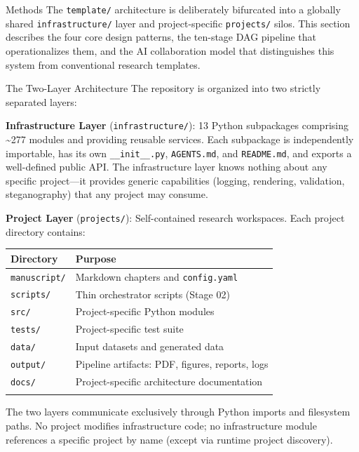 \documentclass[
  ignorenonframetext,
]{beamer}
\author{\texorpdfstring{}{}}
\date{}
\newcounter{none} %
\begin{document}
\begin{frame}[fragile]{Methods}
\protect{}\label{methods}
The \texttt{template/} architecture is deliberately bifurcated into a
globally shared \texttt{infrastructure/} layer and project-specific
\texttt{projects/} silos. This section describes the four core design
patterns, the ten-stage DAG pipeline that operationalizes them, and the
AI collaboration model that distinguishes this system from conventional
research templates.

\begin{block}{The Two-Layer Architecture}
\protect{}\label{the-two-layer-architecture}
The repository is organized into two strictly separated layers:

\textbf{Infrastructure Layer} (\texttt{infrastructure/}): 13 Python
subpackages comprising \textasciitilde277 modules and providing reusable
services. Each subpackage is independently importable, has its own
\texttt{\_\_init\_\_.py}, \texttt{AGENTS.md}, and \texttt{README.md},
and exports a well-defined public API. The infrastructure layer knows
nothing about any specific project---it provides generic capabilities
(logging, rendering, validation, steganography) that any project may
consume.

\textbf{Project Layer} (\texttt{projects/}): Self-contained research
workspaces. Each project directory contains:

{\def\LTcaptype{none} %
\begin{longtable}[]{@{}ll@{}}
\toprule\noalign{}
Directory & Purpose \\
\midrule\noalign{}
\endhead
\texttt{manuscript/} & Markdown chapters and \texttt{config.yaml} \\
\texttt{scripts/} & Thin orchestrator scripts (Stage 02) \\
\texttt{src/} & Project-specific Python modules \\
\texttt{tests/} & Project-specific test suite \\
\texttt{data/} & Input datasets and generated data \\
\texttt{output/} & Pipeline artifacts: PDF, figures, reports, logs \\
\texttt{docs/} & Project-specific architecture documentation \\
\bottomrule\noalign{}
\end{longtable}
}

The two layers communicate exclusively through Python imports and
filesystem paths. No project modifies infrastructure code; no
infrastructure module references a specific project by name (except via
runtime project discovery).
\end{block}


\end{frame}
\end{document}
